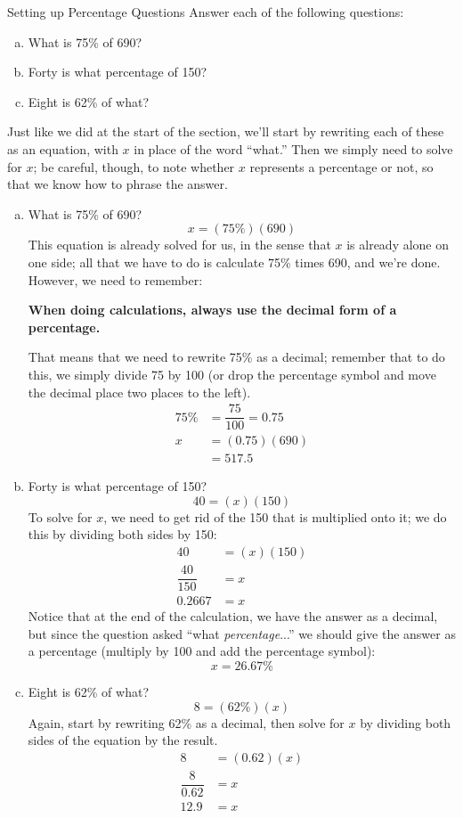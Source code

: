 \begin{example}{Setting up Percentage Questions}
Answer each of the following questions:
\begin{enumerate}[(a)]
\item What is 75\% of 690?
\item Forty is what percentage of 150?
\item Eight is 62\% of what?
\end{enumerate}

\sol
Just like we did at the start of the section, we'll start by rewriting each of these as an equation, with $x$ in place of the word ``what.''  Then we simply need to solve for $x$; be careful, though, to note whether $x$ represents a percentage or not, so that we know how to phrase the answer.

\begin{enumerate}[(a)]
\item What is 75\% of 690?
\[x = (75\%)(690)\]
This equation is already solved for us, in the sense that $x$ is already alone on one side; all that we have to do is calculate 75\% times 690, and we're done.  However, we need to remember:
\begin{center}
\textbf{When doing calculations, always use the decimal form of a percentage.}
\end{center}
That means that we need to rewrite 75\% as a decimal; remember that to do this, we simply divide 75 by 100 (or drop the percentage symbol and move the decimal place two places to the left).
\begin{align*}
75\% &= \dfrac{75}{100} = 0.75\\
x &= (0.75)(690)\\
&= \boxed{517.5}
\end{align*}
\pagebreak

\item Forty is what percentage of 150?
\[40 = (x)(150)\]
To solve for $x$, we need to get rid of the 150 that is multiplied onto it; we do this by dividing both sides by 150:
\begin{align*}
40 &= (x)(150)\\
\dfrac{40}{150} &= x\\
0.2667 &= x
\end{align*}
Notice that at the end of the calculation, we have the answer as a decimal, but since the question asked ``what \emph{percentage}...'' we should give the answer as a percentage (multiply by 100 and add the percentage symbol):
\[x = \boxed{26.67\%}\]

\item Eight is 62\% of what?
\[8 = (62\%)(x)\]
Again, start by rewriting 62\% as a decimal, then solve for $x$ by dividing both sides of the equation by the result.
\begin{align*}
8 &= (0.62)(x)\\
\dfrac{8}{0.62} &= x\\
\boxed{12.9} &= x
\end{align*}
\end{enumerate}
\end{example}

